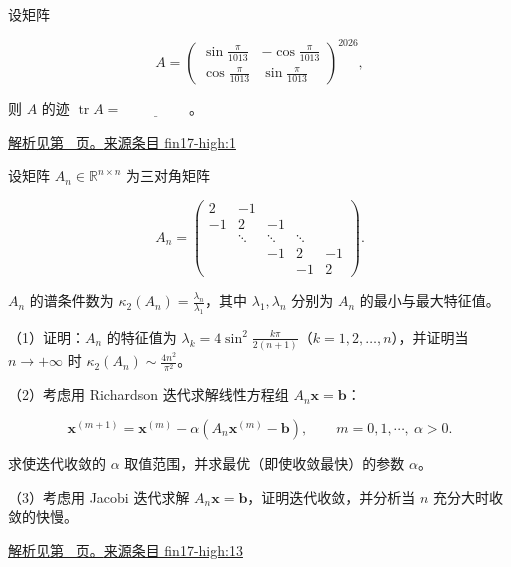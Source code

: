 \documentclass[UTF8,12pt,a4paper,fontset=fandol]{ctexart}
\begin{document}
\begin{example}\label{ex:fin17-high:1}

设矩阵

\[
A=
\begin{pmatrix}
\sin\frac{\pi}{1013} & -\cos\frac{\pi}{1013}\\
\cos\frac{\pi}{1013} & \sin\frac{\pi}{1013}
\end{pmatrix}^{2026},
\]

则 $A$ 的迹 $\operatorname{tr}A=\underline{\hspace{2cm}}$。

\par\hyperref[ans:fin17-high:1]{解析见第~\pageref{ans:fin17-high:1} 页。}\quad\href{https://github.com/lzxcr/cmc-mathematics/blob/64916fa1fdbc3e444a652eca204d5669058ee321/src/problems/finals/17/01.md}{来源条目 fin17-high:1}

\end{example}

\begin{example}\label{ex:fin17-high:13}

设矩阵 $A_n\in\mathbb R^{n\times n}$ 为三对角矩阵

\[
A_n=
\begin{pmatrix}
2 & -1 & & & \\
-1 & 2 & -1 & & \\
& \ddots & \ddots & \ddots & \\
& & -1 & 2 & -1\\
& & & -1 & 2
\end{pmatrix}.
\]

$A_n$ 的谱条件数为 $\kappa_2(A_n)=\frac{\lambda_n}{\lambda_1}$，其中 $\lambda_1,\lambda_n$ 分别为 $A_n$ 的最小与最大特征值。

（1）证明：$A_n$ 的特征值为 $\lambda_k=4\sin^2\frac{k\pi}{2(n+1)}$（$k=1,2,\dots,n$），并证明当 $n\to+\infty$ 时 $\kappa_2(A_n)\sim\frac{4n^2}{\pi^2}$。

（2）考虑用 Richardson 迭代求解线性方程组 $A_n\mathbf x=\mathbf b$：

\[
\mathbf x^{(m+1)}=\mathbf x^{(m)}-\alpha\left(A_n\mathbf x^{(m)}-\mathbf b\right),\qquad m=0,1,\cdots,\ \alpha>0 .
\]

求使迭代收敛的 $\alpha$ 取值范围，并求最优（即使收敛最快）的参数 $\alpha$。

（3）考虑用 Jacobi 迭代求解 $A_n\mathbf x=\mathbf b$，证明迭代收敛，并分析当 $n$ 充分大时收敛的快慢。

\par\hyperref[ans:fin17-high:13]{解析见第~\pageref{ans:fin17-high:13} 页。}\quad\href{https://github.com/lzxcr/cmc-mathematics/blob/64916fa1fdbc3e444a652eca204d5669058ee321/src/problems/finals/17/16.md}{来源条目 fin17-high:13}

\end{example}
\end{document}
